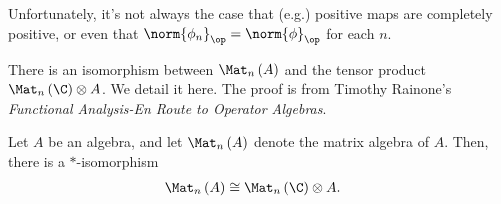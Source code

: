 \documentclass[10pt]{mypackage}
\begin{document}
Unfortunately, it's not always the case that (e.g.) positive maps are completely positive, or even that $\norm{\phi_n}_{\op} = \norm{\phi}_{\op}$ for each $n$.\newline

There is an isomorphism between $\Mat_n\left( A \right)$ and the tensor product $\Mat_n\left( \C \right)\otimes A$. We detail it here. The proof is from Timothy Rainone's \textit{Functional Analysis-En Route to Operator Algebras}.
\begin{theorem}
  Let $A$ be an algebra, and let $\Mat_n\left( A \right)$ denote the matrix algebra of $A$. Then, there is a $\ast$-isomorphism
  \begin{align*}
    \Mat_n\left( A \right) &\cong \Mat_n\left( \C \right)\otimes A.
  \end{align*}
\end{theorem}
\end{document}
